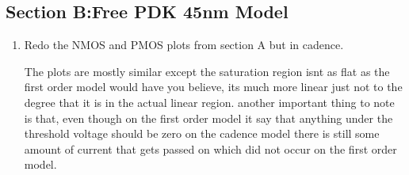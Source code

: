 \documentclass{article}
\begin{document}
\subsection*{Section B:Free PDK 45nm Model}
\begin{enumerate}
    \item Redo the NMOS and PMOS plots from section A but in cadence.
    \begin{center}
    \end{center}
    \begin{center}
    \end{center}
    \begin{center}
        The plots are mostly similar except the saturation region isnt as flat as the first order model would have you believe, its much more linear just not to the degree that it is in the actual linear region. another important thing to note is that, even though on the first order model it say that anything under the threshold voltage should be zero on the cadence model there is still some amount of current that gets passed on which did not occur on the first order model.

\end{center}
\end{enumerate}
\end{document}
